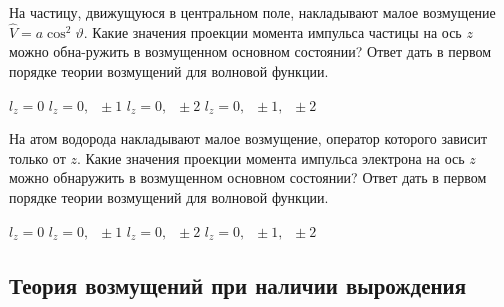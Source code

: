 \documentclass[11pt,a4paper]{exam}
\begin{document}
\begin{questions}
\question  На частицу, движущуюся в центральном поле, накладывают малое возмущение $\hat V = a{\cos ^2}\vartheta $. Какие значения проекции момента импульса частицы на ось $z$ можно обна-ружить в возмущенном основном состоянии? Ответ дать в первом порядке теории возмущений для волновой функции.
\begin{choices}
\choice ${l_z} = 0$ 
\choice ${l_z} = 0,\;\; \pm 1$     
\choice ${l_z} = 0,\;\; \pm 2$     
\choice ${l_z} = 0,\;\; \pm 1,\;\; \pm 2$
\end{choices}

\question На атом водорода накладывают малое возмущение, оператор которого зависит только от $z$. Какие значения проекции момента импульса электрона на ось $z$ можно обнаружить в возмущенном основном состоянии? Ответ дать в первом порядке теории возмущений для волновой функции.
\begin{choices}
\choice ${l_z} = 0$ 
\choice ${l_z} = 0,\;\; \pm 1$     
\choice ${l_z} = 0,\;\; \pm 2$     
\choice ${l_z} = 0,\;\; \pm 1,\;\; \pm 2$
\end{choices}

\end{questions}




\subsection{ Теория возмущений при наличии вырождения }
\end{document}
